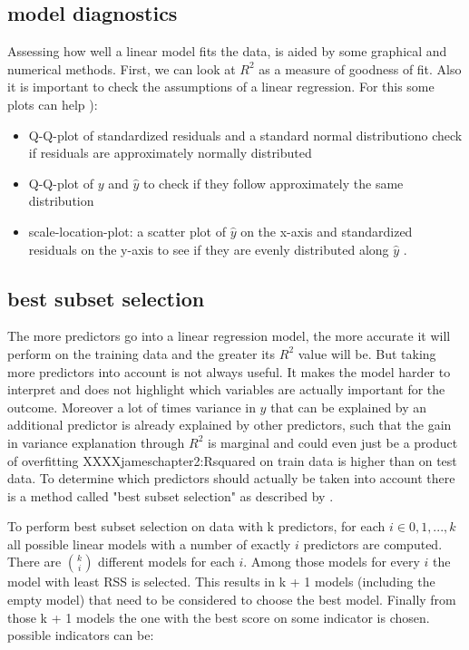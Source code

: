 \documentclass[12 pt]{scrartcl}
\begin{document}
\subsection{model diagnostics}
Assessing how well a linear model fits the data, is aided by some graphical and numerical methods.
First, we can look at $R^2$ as a measure of goodness of fit. Also it is important to check the assumptions of a linear regression. For this some plots can help \citep{Understa39}):
\begin{itemize}
  \item Q-Q-plot of standardized residuals and a standard normal distributiono check if residuals are approximately normally distributed
  \item Q-Q-plot of $y$ and $\hat{y}$ to check if they follow approximately the same distribution
  \item scale-location-plot: a scatter plot of $\hat{y}$ on the x-axis and standardized residuals on the y-axis to see if they are evenly distributed along $\hat{y}$ .
\end{itemize}

\subsection{best subset selection}

The more predictors go into a linear regression model, the more accurate it will perform on the training data and the greater its $R^2$ value will be. But taking more predictors into account is not always useful. It makes the model harder to interpret and does not highlight which variables are actually important for the outcome. Moreover a lot of times variance in $y$ that can be explained by an additional predictor is already explained by other predictors, such that the gain in variance explanation through $R^2$ is marginal and could even just be a product of overfitting XXXXjameschapter2:Rsquared on train data is higher than on test data.
To determine which predictors should actually be taken into account there is a method called "best subset selection" as described by \citet[p.~227]{james2013introduction}.

To perform best subset selection on data with k predictors, for each $i \in {0,1,...,k}$ all possible linear models with a number of exactly $i$ predictors are computed. There are ${k}\choose{i}$ different models for each $i$. Among those models for every $i$ the model with least RSS is selected. This results in k + 1 models (including the empty model) that need to be considered to choose the best model. Finally from those  k + 1 models the one with the best score on some indicator is chosen.
possible indicators can be:
\end{document}
